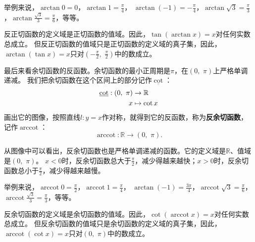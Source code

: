 \documentclass[12pt,UTF8]{ctexbook}
\newcommand{\arccot}{\operatorname{arccot}}
\begin{document}
举例来说，$\arctan{0} = 0$，$\arctan{1} = \frac{\pi}{4}$，
$\arctan{(-1)} = -\frac{\pi}{4}$，$\arctan{\sqrt{3}} = \frac{\pi}{3}$，$\arctan{\frac{\sqrt{3}}{3}} = \frac{\pi}{6}$，等等。

反正切函数的定义域是正切函数的值域。因此，$\tan{(\arctan{x})} = x$对任何实数总成立。
但反正切函数的值域只是正切函数的定义域的真子集，因此，$\arctan{(\tan{x})} = x$只对$(-\frac{\pi}{2}, \,\, \frac{\pi}{2})$中的数成立。

最后来看余切函数的反函数。余切函数的最小正周期是$\pi$，在$(0, \,\, \pi)$上严格单调递减。
我们把余切函数在这个区间上的部分记作$\underline{\cot}$：
\begin{align}
    \underline{\cot} : (0, \,\, \pi) &\rightarrow \mathbb{R} \notag \\
                                   x &\mapsto \cot{x} \notag
\end{align}
画出它的图像，按照直线$l: y = x$作对称，就得到它的反函数，称为\textbf{反余切函数}，记作$\arccot$：
$$ \arccot : \mathbb{R} \rightarrow (0, \,\, \pi) . $$


从图像中可以看出，反余切函数也是严格单调递减的函数。它的定义域是$\mathbb{R}$、值域是$(0, \,\, \pi)$。
$x < 0$时，反余切函数总大于$\frac{\pi}{2}$，减少得越来越快；$x > 0$时，反余切函数总小于$\frac{\pi}{2}$，减少得越来越慢。

举例来说，$\arccot{0} = \frac{\pi}{2}$，$\arccot{1} = \frac{\pi}{4}$，
$\arctan{(-1)} = \frac{3\pi}{4}$，$\arccot{\sqrt{3}} = \frac{\pi}{6}$，$\arccot{\frac{\sqrt{3}}{3}} = \frac{\pi}{3}$，等等。

反余切函数的定义域是余切函数的值域。因此，$\cot{(\arccot{x})} = x$对任何实数总成立。
但反余切函数的值域只是余切函数的定义域的真子集，因此，$\arccot{(\cot{x})} = x$只对$(0, \,\, \pi)$中的数成立。
\end{document}
